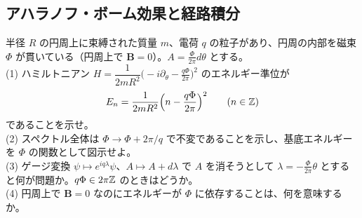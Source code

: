 \subsection{アハラノフ・ボーム効果と経路積分}

\begin{problem}[難易度 B]\label{ch02-prob-ring}
半径 $R$ の円周上に束縛された質量 $m$、電荷 $q$ の粒子があり、円周の内部を磁束 $\Phi$ が貫いている（円周上で $\bm B=0$）。$A=\frac{\Phi}{2\pi}d\theta$ とする。\\
(1) ハミルトニアン $H=\dfrac{1}{2mR^2}\bigl(-i\partial_\theta-\tfrac{q\Phi}{2\pi}\bigr)^2$ のエネルギー準位が
\[
E_n=\frac{1}{2mR^2}\Bigl(n-\frac{q\Phi}{2\pi}\Bigr)^2\qquad(n\in\mathbb{Z})
\]
であることを示せ。\\
(2) スペクトル全体は $\Phi\to\Phi+2\pi/q$ で不変であることを示し、基底エネルギーを $\Phi$ の関数として図示せよ。\\
(3) ゲージ変換 $\psi\mapsto e^{iq\lambda}\psi$、$A\mapsto A+d\lambda$ で $A$ を消そうとして $\lambda=-\frac{\Phi}{2\pi}\theta$ とすると何が問題か。$q\Phi\in2\pi\mathbb{Z}$ のときはどうか。\\
(4) 円周上で $\bm B=0$ なのにエネルギーが $\Phi$ に依存することは、何を意味するか。
\end{problem}

